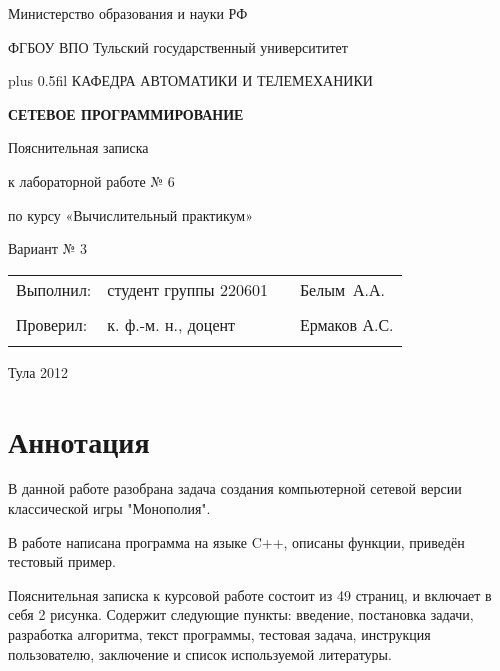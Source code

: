 \documentclass[a4paper,12pt,russian]{article}
\makeatletter
\renewcommand{\normalfont}{\fontsize{14}{20}\fontfamily{ftm}\linespread{1.25}\selectfont}
\renewcommand{\tiny}{\fontsize{12}{14}\fontfamily{ftm}\linespread{1.0}\selectfont}
\renewcommand{\maketitle}[2]{
\begin{titlepage}
\begin{center}\linespread{1}\parskip=0.0cm\normalfont
Министерство образования и науки РФ

ФГБОУ ВПО Тульский государственный университитет

\vskip 0pt plus 0.5fil
КАФЕДРА АВТОМАТИКИ И ТЕЛЕМЕХАНИКИ

\vfill
\textbf{#1}

\vskip 2cm
Пояснительная записка 

к лабораторной работе № #2


по курсу «Вычислительный практикум»

\vfill
Вариант № 3

\vfill
\begin{tabular*}{\textwidth}{ll@{\extracolsep{\fill}}c@{\extracolsep{0pt}}l}
Выполнил: & студент группы 220601&&Белым~А.А.\\ \cline{3-3}
								&&\tiny{(подпись)}& 	\\
Проверил: & к. ф.-м. н., доцент &&Ермаков А.С.\\ \cline{3-3}
								&&\tiny{(подпись)}& 	\\
\end{tabular*}
\vfill
Тула 2012
\end{center}
\end{titlepage}
}
\newcommand{\ssec}[1]{\section{#1}\hspace*{\parindent}}
\makeatother
\begin{document}
\maketitle {СЕТЕВОЕ ПРОГРАММИРОВАНИЕ}{6}
\ssec{Аннотация}
\normalfont
В данной работе разобрана задача создания компьютерной сетевой версии классической игры "Монополия".

В работе написана программа на языке C++, описаны функции, приведён тестовый пример.

Пояснительная записка к курсовой работе состоит из 49 страниц, и включает в себя 2 рисунка. Содержит следующие пункты: введение, постановка задачи, разработка алгоритма, текст программы, тестовая задача, инструкция пользователю, заключение и список используемой литературы.
\end{document}
